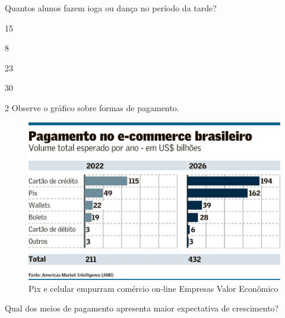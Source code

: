 Quantos alunos fazem ioga ou dança no período da tarde?

\begin{escolha}

  \item 15

  \item 8

  \item 23

  \item 30

\end{escolha}

\pagebreak
\num{2} Observe o gráfico sobre formas de pagamento. 

\begin{figure}[htpb!]
\centering
\includegraphics[width=\textwidth]{./_SAEB_9_MAT/media/image225.jpeg}
\caption{Pix e celular empurram comércio on-line \textbar{} Empresas
\textbar{} Valor Econômico}
\end{figure}



Qual dos meios de pagamento apresenta maior expectativa de crescimento?

